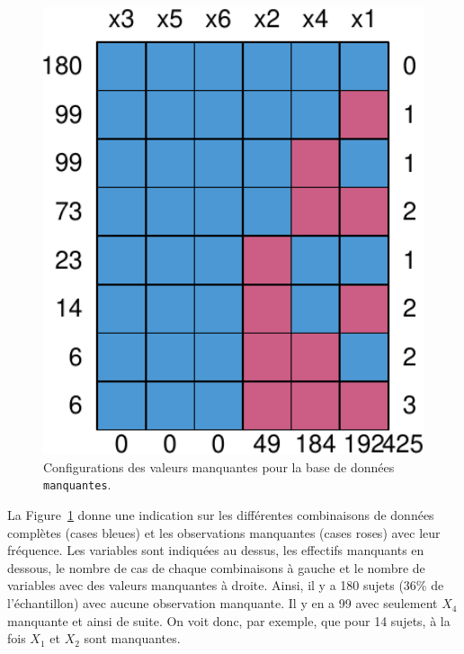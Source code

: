 \documentclass[
  11pt,
  letterpaper,
]{book}
\theoremstyle{definition}
\theoremstyle{remark}
\begin{document}
\begin{figure}[ht!]

{\centering \includegraphics[width=1\textwidth,height=\textheight]{./07-donneesmanquantes_files/figure-pdf/fig-manquantes2-1.pdf}

}

\caption{\label{fig-manquantes2}Configurations des valeurs manquantes
pour la base de données \texttt{manquantes}.}

\end{figure}

La Figure~\ref{fig-manquantes2} donne une indication sur les différentes
combinaisons de données complètes (cases bleues) et les observations
manquantes (cases roses) avec leur fréquence. Les variables sont
indiquées au dessus, les effectifs manquants en dessous, le nombre de
cas de chaque combinaisons à gauche et le nombre de variables avec des
valeurs manquantes à droite. Ainsi, il y a 180 sujets (36\% de
l'échantillon) avec aucune observation manquante. Il y en a 99 avec
seulement \(X_4\) manquante et ainsi de suite. On voit donc, par
exemple, que pour 14 sujets, à la fois \(X_1\) et \(X_2\) sont
manquantes.
\end{document}

